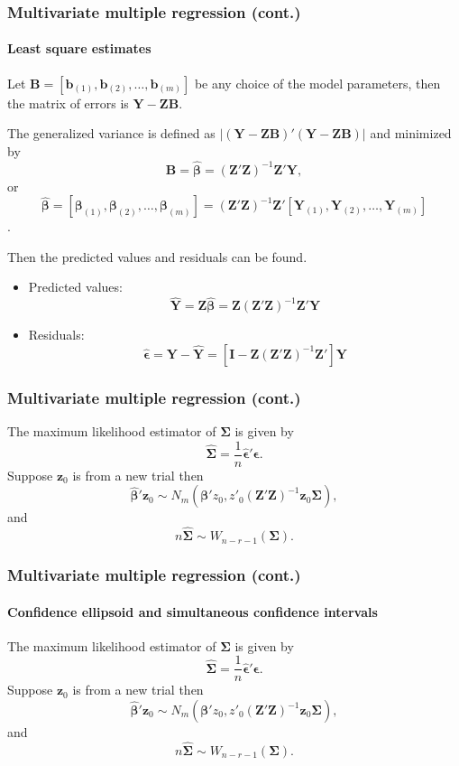 \documentclass{beamer}
\begin{document}
	\begin{frame}
		\frametitle{Multivariate multiple regression (cont.)}
		\framesubtitle{Least square estimates}
		Let $\pmb{ B } = [ \pmb{ b }_{ ( 1 ) }, \pmb{ b }_{ ( 2 ) }, \dots, \pmb{ b }_{ ( m ) } ]$ be any choice of the model parameters, then the matrix of errors is $\pmb{ Y } - \pmb{ ZB }$.
		
		The generalized variance is defined as $| ( \pmb{ Y } - \pmb{ ZB } )'( \pmb{ Y } - \pmb{ ZB } ) |$ and minimized by 
		\[ \pmb{ B } = \hat{\pmb{ \beta }} = ( \pmb{ Z }'\pmb{ Z } ) ^ { -1 } \pmb{ Z }'\pmb{ Y }, \]
		or 
		\[ \hat{\pmb{ \beta }} = [ \pmb{ \beta }_{ ( 1 ) }, \pmb{ \beta }_{ ( 2 ) }, \dots, \pmb{ \beta }_{ ( m ) } ] = ( \pmb{ Z }'\pmb{ Z } ) ^ { -1 }\pmb{ Z }' [ \pmb{ Y }_{ ( 1 ) }, \pmb{ Y }_{ ( 2 ) }, \dots, \pmb{ Y }_{ ( m ) } ]\].
		
		Then the predicted values and residuals can be found.
		\begin{itemize}
			\item Predicted values: 
			\[ \hat{ \pmb{Y} } = \pmb{ Z } \hat{ \pmb{ \beta } } = \pmb{ Z } ( \pmb{Z}' \pmb{Z} ) ^ { -1 } \pmb{ Z }' \pmb{ Y } \]
			\item Residuals: \[ \hat{ \pmb{ \epsilon } } = \pmb{ Y } - \hat{ \pmb{ Y } } = [ \pmb{ I } - \pmb{ Z }( \pmb{ Z }'\pmb{ Z } ) ^ { -1 } \pmb{ Z }' ] \pmb{ Y } \]
		\end{itemize}
	\end{frame}
	
	\begin{frame}
		\frametitle{Multivariate multiple regression (cont.)}
		The maximum likelihood estimator of $\pmb{ \Sigma }$ is given by
		\[ \hat{\pmb{ \Sigma }} = \frac{ 1 }{ n } \hat{ \pmb{ \epsilon } }' \pmb{ \epsilon }. \]
		Suppose $\pmb{ z }_{ 0 }$ is from a new trial then 
		\[ \hat{ \pmb{ \beta } }' \pmb{ z }_0 \sim N_m( \pmb{ \beta }' z_0, z'_0( \pmb{ Z }'\pmb{ Z } )^ { -1 } \pmb{ z }_0 \pmb{ \Sigma } ), \]
		and 
		\[ n \hat{ \pmb{ \Sigma } } \sim W_{ n - r - 1 }( \pmb{ \Sigma } ). \]
	\end{frame}
	
	\begin{frame}
		\frametitle{Multivariate multiple regression (cont.)}
		\framesubtitle{Confidence ellipsoid and simultaneous confidence intervals}
		The maximum likelihood estimator of $\pmb{ \Sigma }$ is given by
		\[ \hat{\pmb{ \Sigma }} = \frac{ 1 }{ n } \hat{ \pmb{ \epsilon } }' \pmb{ \epsilon }. \]
		Suppose $\pmb{ z }_{ 0 }$ is from a new trial then 
		\[ \hat{ \pmb{ \beta } }' \pmb{ z }_0 \sim N_m( \pmb{ \beta }' z_0, z'_0( \pmb{ Z }'\pmb{ Z } )^ { -1 } \pmb{ z }_0 \pmb{ \Sigma } ), \]
		and 
		\[ n \hat{ \pmb{ \Sigma } } \sim W_{ n - r - 1 }( \pmb{ \Sigma } ). \]
	\end{frame}

	\begin{frame}[allowframebreaks]
		\begin{singlespace}
			
			
		\end{singlespace}
	\end{frame}
\end{document}
